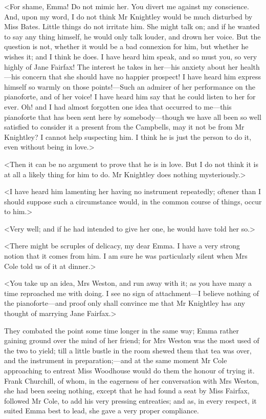 <For shame, Emma! Do not mimic her. You divert me against my conscience. And, upon my word, I do not think Mr Knightley would be much disturbed by Miss Bates. Little things do not irritate him. She might talk on; and if he wanted to say any thing himself, he would only talk louder, and drown her voice. But the question is not, whether it would be a bad connexion for him, but whether he wishes it; and I think he does. I have heard him speak, and so must you, so very highly of Jane Fairfax! The interest he takes in her—his anxiety about her health—his concern that she should have no happier prospect! I have heard him express himself so warmly on those points!—Such an admirer of her performance on the pianoforte, and of her voice! I have heard him say that he could listen to her for ever. Oh! and I had almost forgotten one idea that occurred to me—this pianoforte that has been sent here by somebody—though we have all been so well satisfied to consider it a present from the Campbells, may it not be from Mr Knightley? I cannot help suspecting him. I think he is just the person to do it, even without being in love.>

<Then it can be no argument to prove that he is in love. But I do not think it is at all a likely thing for him to do. Mr Knightley does nothing mysteriously.>

<I have heard him lamenting her having no instrument repeatedly; oftener than I should suppose such a circumstance would, in the common course of things, occur to him.>

<Very well; and if he had intended to give her one, he would have told her so.>

<There might be scruples of delicacy, my dear Emma. I have a very strong notion that it comes from him. I am sure he was particularly silent when Mrs Cole told us of it at dinner.>

<You take up an idea, Mrs Weston, and run away with it; as you have many a time reproached me with doing. I see no sign of attachment—I believe nothing of the pianoforte—and proof only shall convince me that Mr Knightley has any thought of marrying Jane Fairfax.>

They combated the point some time longer in the same way; Emma rather gaining ground over the mind of her friend; for Mrs Weston was the most used of the two to yield; till a little bustle in the room shewed them that tea was over, and the instrument in preparation;—and at the same moment Mr Cole approaching to entreat Miss Woodhouse would do them the honour of trying it. Frank Churchill, of whom, in the eagerness of her conversation with Mrs Weston, she had been seeing nothing, except that he had found a seat by Miss Fairfax, followed Mr Cole, to add his very pressing entreaties; and as, in every respect, it suited Emma best to lead, she gave a very proper compliance.


